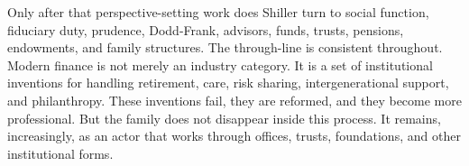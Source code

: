 Only after that perspective-setting work does Shiller turn to social function, fiduciary duty, prudence, Dodd-Frank, advisors, funds, trusts, pensions, endowments, and family structures. The through-line is consistent throughout. Modern finance is not merely an industry category. It is a set of institutional inventions for handling retirement, care, risk sharing, intergenerational support, and philanthropy. These inventions fail, they are reformed, and they become more professional. But the family does not disappear inside this process. It remains, increasingly, as an actor that works through offices, trusts, foundations, and other institutional forms.
